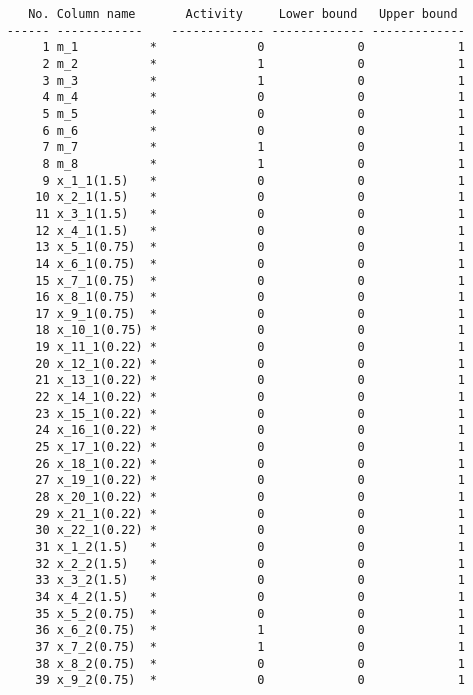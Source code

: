 \documentclass{article}[A4]
\begin{document}
\begin{verbatim}
	   No. Column name       Activity     Lower bound   Upper bound
	------ ------------    ------------- ------------- -------------
		 1 m_1          *              0             0             1 
		 2 m_2          *              1             0             1 
		 3 m_3          *              1             0             1 
		 4 m_4          *              0             0             1 
		 5 m_5          *              0             0             1 
		 6 m_6          *              0             0             1 
		 7 m_7          *              1             0             1 
		 8 m_8          *              1             0             1 
		 9 x_1_1(1.5)   *              0             0             1 
		10 x_2_1(1.5)   *              0             0             1 
		11 x_3_1(1.5)   *              0             0             1 
		12 x_4_1(1.5)   *              0             0             1 
		13 x_5_1(0.75)  *              0             0             1 
		14 x_6_1(0.75)  *              0             0             1 
		15 x_7_1(0.75)  *              0             0             1 
		16 x_8_1(0.75)  *              0             0             1 
		17 x_9_1(0.75)  *              0             0             1 
		18 x_10_1(0.75) *              0             0             1 
		19 x_11_1(0.22) *              0             0             1 
		20 x_12_1(0.22) *              0             0             1 
		21 x_13_1(0.22) *              0             0             1 
		22 x_14_1(0.22) *              0             0             1 
		23 x_15_1(0.22) *              0             0             1 
		24 x_16_1(0.22) *              0             0             1 
		25 x_17_1(0.22) *              0             0             1 
		26 x_18_1(0.22) *              0             0             1 
		27 x_19_1(0.22) *              0             0             1 
		28 x_20_1(0.22) *              0             0             1 
		29 x_21_1(0.22) *              0             0             1 
		30 x_22_1(0.22) *              0             0             1 
		31 x_1_2(1.5)   *              0             0             1 
		32 x_2_2(1.5)   *              0             0             1 
		33 x_3_2(1.5)   *              0             0             1 
		34 x_4_2(1.5)   *              0             0             1 
		35 x_5_2(0.75)  *              0             0             1 
		36 x_6_2(0.75)  *              1             0             1 
		37 x_7_2(0.75)  *              1             0             1 
		38 x_8_2(0.75)  *              0             0             1 
		39 x_9_2(0.75)  *              0             0             1 

\end{verbatim}
\end{document}
